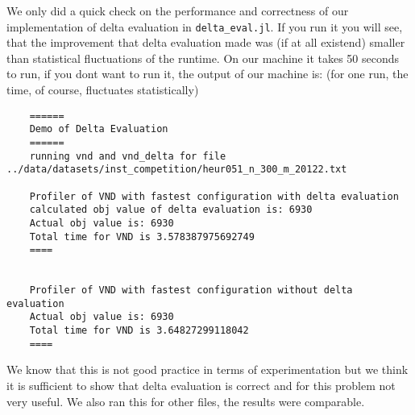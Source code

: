 We only did a quick check on the performance and correctness of our implementation of delta evaluation in 
\texttt{delta\_eval.jl}. If you run it you will see, that the improvement that delta evaluation made was 
(if at all existend) smaller than statistical fluctuations of the runtime. On our machine it takes 50 seconds 
to run, if you dont want to run it, the output of our machine is: (for one run, the time, of course, fluctuates 
statistically)

\begin{verbatim}
    ======
    Demo of Delta Evaluation
    ======
    running vnd and vnd_delta for file ../data/datasets/inst_competition/heur051_n_300_m_20122.txt
    
    Profiler of VND with fastest configuration with delta evaluation
    calculated obj value of delta evaluation is: 6930
    Actual obj value is: 6930
    Total time for VND is 3.578387975692749
    ====
    
    
    Profiler of VND with fastest configuration without delta evaluation
    Actual obj value is: 6930
    Total time for VND is 3.64827299118042
    ====
\end{verbatim}

We know that this is not good practice in terms of experimentation but we think it is sufficient to show 
that delta evaluation is correct and for this problem not very useful. We also ran this for other files, the 
results were comparable.\\